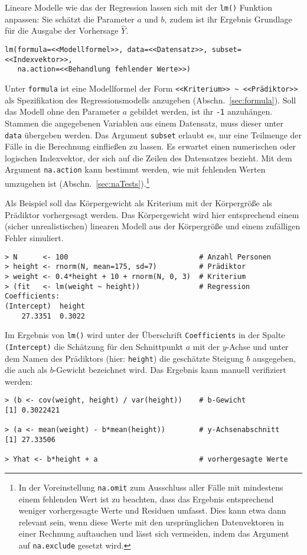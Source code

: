 Lineare Modelle wie das der Regression lassen sich mit der \lstinline!lm()! Funktion anpassen: Sie schätzt die Parameter $a$ und $b$, zudem ist ihr Ergebnis Grundlage für die Ausgabe der Vorhersage $\hat{Y}$.
\begin{lstlisting}
lm(formula=<<Modellformel>>, data=<<Datensatz>>, subset=<<Indexvektor>>,
   na.action=<<Behandlung fehlender Werte>>)
\end{lstlisting}

Unter \lstinline!formula! ist eine Modellformel der Form \lstinline!<<Kriterium>> ~ <<Prädiktor>>! als Spezifikation des Regressionsmodells anzugeben (Abschn.\ \ref{sec:formula}). Soll das Modell ohne den Parameter $a$ gebildet werden, ist ihr \lstinline!-1! anzuhängen. Stammen die angegebenen Variablen aus einem Datensatz, muss dieser unter \lstinline!data! übergeben werden. Das Argument \lstinline!subset! erlaubt es, nur eine Teilmenge der Fälle in die Berechnung einfließen zu lassen. Es erwartet einen numerischen oder logischen Indexvektor, der sich auf die Zeilen des Datensatzes bezieht. Mit dem Argument \lstinline!na.action! kann bestimmt werden, wie mit fehlenden Werten umzugehen ist (Abschn.\ \ref{sec:naTests}).\footnote{In der Voreinstellung \lstinline!na.omit! zum Ausschluss aller Fälle mit mindestens einem fehlenden Wert ist zu beachten, dass das Ergebnis entsprechend weniger vorhergesagte Werte und Residuen umfasst. Dies kann etwa dann relevant sein, wenn diese Werte mit den ursprünglichen Datenvektoren in einer Rechnung auftauchen und lässt sich vermeiden, indem das Argument auf \lstinline!na.exclude! gesetzt wird.}

Als Beispiel soll das Körpergewicht als Kriterium mit der Körpergröße als Prädiktor vorhergesagt werden. Das Körpergewicht wird hier entsprechend einem (sicher unrealistischen) linearen Modell aus der Körpergröße und einem zufälligen Fehler simuliert.
\begin{lstlisting}
> N      <- 100                               # Anzahl Personen
> height <- rnorm(N, mean=175, sd=7)          # Prädiktor
> weight <- 0.4*height + 10 + rnorm(N, 0, 3)  # Kriterium
> (fit   <- lm(weight ~ height))              # Regression
Coefficients:
(Intercept)  height
    27.3351  0.3022
\end{lstlisting}

Im Ergebnis von \lstinline!lm()! wird unter der Überschrift \lstinline!Coefficients! in der Spalte \lstinline!(Intercept)! die Schätzung für den Schnittpunkt $a$ mit der $y$-Achse und unter dem Namen des Prädiktors (hier: \lstinline!height!) die geschätzte Steigung $b$ ausgegeben, die auch als $b$-Gewicht bezeichnet wird. Das Ergebnis kann manuell verifiziert werden:
\begin{lstlisting}
> (b <- cov(weight, height) / var(height))    # b-Gewicht
[1] 0.3022421

> (a <- mean(weight) - b*mean(height))        # y-Achsenabschnitt
[1] 27.33506

> Yhat <- b*height + a                        # vorhergesagte Werte
\end{lstlisting}

